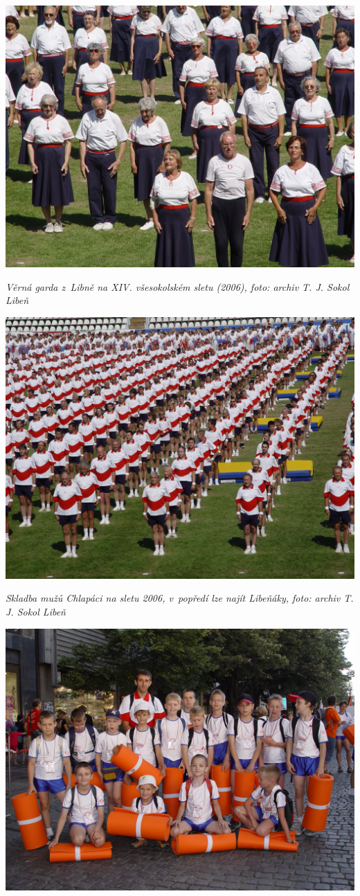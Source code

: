 \documentclass[a5paper, 11pt, twoside]{article}
\begin{document}
 \includegraphics[width=\textwidth]{img/54_garda.JPG}

\textit{Věrná garda z~Libně na XIV. všesokolském sletu (2006), foto:
archiv T. J. Sokol Libeň}

 \includegraphics[width=\textwidth]{img/55_chalpaci.JPG}

\textit{Skladba mužů Chlapáci na sletu 2006, v~popředí lze najít Libeňáky,
foto: archiv T. J. Sokol Libeň}

 \includegraphics[width=\textwidth]{img/56_karimatky.JPG}
\end{document}
